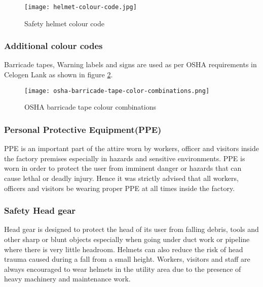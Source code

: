 \documentclass[a4paper,12pt]{article}
\begin{document}
				\begin{figure}[H]
					\begin{center}				
						\texttt{[image: helmet-colour-code.jpg]}
					\end{center}
					\caption{Safety helmet colour code}
					\label{fig:safety-helmet-colour-code}
				\end{figure}			
			
			\newpage
			\subsubsection{Additional colour codes}
				
				Barricade tapes, Warning labels and signs are used as per OSHA requirements in Celogen Lank as shown in figure \ref{fig:osha-barricade-tape-color-combinations}.
				
				\begin{figure}[H]
					\begin{center}				
						\texttt{[image: osha-barricade-tape-color-combinations.png]}
					\end{center}
					\caption{OSHA barricade tape colour combinations}
					\label{fig:osha-barricade-tape-color-combinations}
				\end{figure}				
				
				\newpage
				\subsubsection{Personal Protective Equipment(PPE)}
					
					PPE is an important part of the attire worn by workers, officer and visitors inside the factory premises especially in hazards and sensitive environments.
					PPE is worn in order to protect the user from imminent danger or hazards that can cause lethal or deadly injury.
					Hence it was strictly advised that all workers, officers and visitors be wearing proper PPE at all times inside the factory.
					\subsubsection*{Safety Head gear}
						
						Head gear is designed to protect the head of its user from falling debris, tools and other sharp or blunt objects especially when going under duct work or pipeline where there is very little headroom.
						Helmets can also reduce the risk of head trauma caused during a fall from a small height.
						Workers, visitors and staff are always encouraged to wear helmets in the utility area due to the presence of heavy machinery and maintenance work.\\
								
\end{document}
